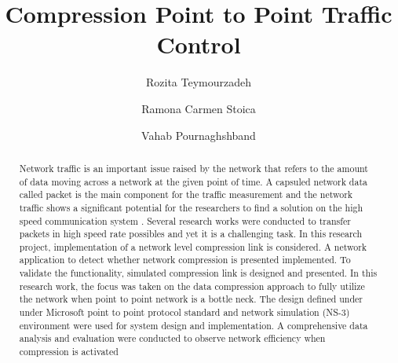 \documentclass[sigconf]{acmart}
\begin{document}
\title{Compression Point to Point Traffic Control}

\author{Rozita Teymourzadeh}
\authornotemark[1]

\author{Ramona Carmen Stoica}
\authornotemark[2]

\author{Vahab Pournaghshband}
\authornotemark[3]

\renewcommand{\shortauthors}{Trovato and Tobin, et al.}

\begin{abstract}
Network traffic is an important issue raised by the network that refers to 
the amount of data moving across a network at the given point of time. 
A capsuled network data called packet is the main component for the 
traffic measurement and the network traffic shows a significant potential
for the researchers to find a solution on the high speed communication 
system \cite{campbell1974portable}\cite{bertsekas1987chapter}\cite{deng2012online}.  Several research works were conducted to transfer packets 
in high speed rate possibles and yet it is a challenging task.  In this research project, implementation of a network level compression link is considered. A network application to detect whether network compression is presented implemented. To validate the functionality, simulated compression link is designed and presented. In this research 
work, the focus was taken on the data compression approach to fully utilize 
the network when point to point network is a bottle neck. The design defined 
under under Microsoft  point to point protocol standard and network simulation 
(NS-3) environment were used for system design and implementation. 
A comprehensive data analysis and evaluation were conducted to observe 
network efficiency when compression is activated 
\end{abstract}
\end{document}
